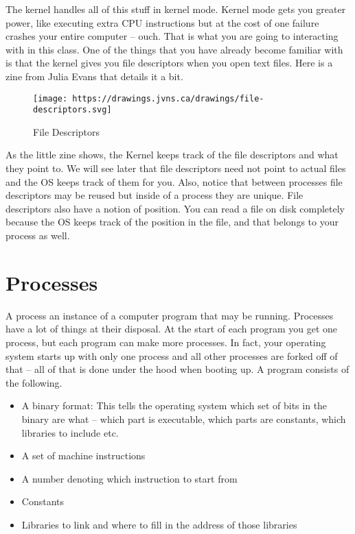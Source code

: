The kernel handles all of this stuff in kernel mode.
Kernel mode gets you greater power, like executing extra CPU instructions but at the cost of one failure crashes your entire computer -- ouch.
That is what you are going to interacting with in this class.
One of the things that you have already become familiar with is that the kernel gives you file descriptors when you open text files.
Here is a zine from Julia Evans that details it a bit.

\begin{figure}[htbp]
  \centering
  \texttt{[image: https://drawings.jvns.ca/drawings/file-descriptors.svg]}
  \caption{File Descriptors}
\end{figure}

As the little zine shows, the Kernel keeps track of the file descriptors and what they point to.
We will see later that file descriptors need not point to actual files and the OS keeps track of them for you.
Also, notice that between processes file descriptors may be reused but inside of a process they are unique.
File descriptors also have a notion of position. You can read a file on disk completely because the OS keeps track of the position in the file, and that belongs to your process as well.

\section{Processes}

A process an instance of a computer program that may be running.
Processes have a lot of things at their disposal.
At the start of each program you get one process, but each program can make more processes.
In fact, your operating system starts up with only one process and all other processes are forked off of that -- all of that is done under the hood when booting up. A program consists of the following.

\begin{itemize}
\item A binary format: This tells the operating system which set of bits in the binary are what -- which part is executable, which parts are constants, which libraries to include etc. 
\item A set of machine instructions 
\item A number denoting which instruction to start from
\item Constants
\item Libraries to link and where to fill in the address of those libraries
\end{itemize}

